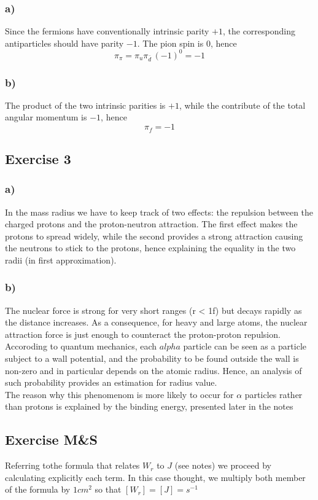 \subsubsection*{a)}
Since the fermions have conventionally intrinsic parity $+1$, the corresponding antiparticles
should have parity $-1$. The pion spin is $0$, hence
$$\pi_{\pi} = \pi_u \pi_{\bar d} \, (-1)^0 = -1$$

\subsubsection*{b)}
The product of the two intrinsic parities is $+1$, while the contribute of the total angular momentum
is $-1$, hence $$\pi_f = -1$$

\subsection*{Exercise 3}

\subsubsection*{a)}
In the mass radius we have to keep track of two effects: the repulsion between the charged protons and the
proton-neutron attraction. The first effect makes the protons to spread widely, while the second provides
a strong attraction causing the neutrons to stick to the protons, hence explaining the equality in the two 
radii (in first approximation).

\subsubsection*{b)}
The nuclear force is strong for very short ranges (r < 1f) but decays rapidly as the distance increases.
As a consequence, for heavy and large atoms, the nuclear attraction force is just enough to counteract
the proton-proton repulsion. Accoroding to quantum mechanics, each $alpha$ particle can be seen as a
particle subject to a wall potential, and the probability to be found outside the wall is non-zero
and in particular depends on the atomic radius. Hence, an analysis of such probability provides
an estimation for radius value. \\
The reason why this phenomenom is more likely to occur for $\alpha$ particles rather than protons
is explained by the binding energy, presented later in the notes

\subsection*{Exercise M\&S}
Referring tothe formula that relates $W_r$ to $J$ (see notes) we proceed by calculating
explicitly each term. In this case thought, we multiply both member of the formula by $1cm^2$ so that $\left[W_r\right] = \left[J\right] = s^{-1}$

